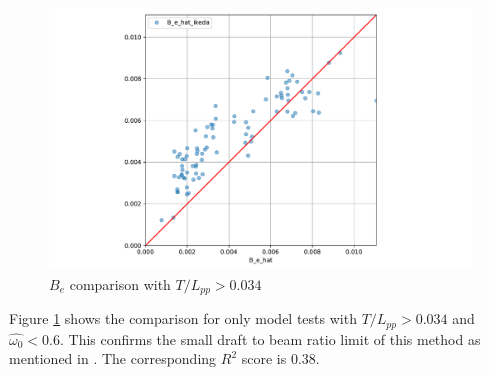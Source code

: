 \begin{figure}[H]
    \centering
    \includegraphics[width=\columnwidth]{figures/B_e_hat_good.pdf}
    \caption{$\hat{B_e}$ comparison with $T/L_{pp}>0.034$}
    \label{fig:B_e_hat_good}
\end{figure}

Figure \ref{fig:B_e_hat_good} shows the comparison for only model tests with $T/L_{pp}>0.034$ and $\hat{\omega_0} < 0.6$.
This confirms the small draft to beam ratio limit of this method as mentioned in \parencite{kawahara_simple_2011}. The corresponding $R^2$ score is 0.38.

